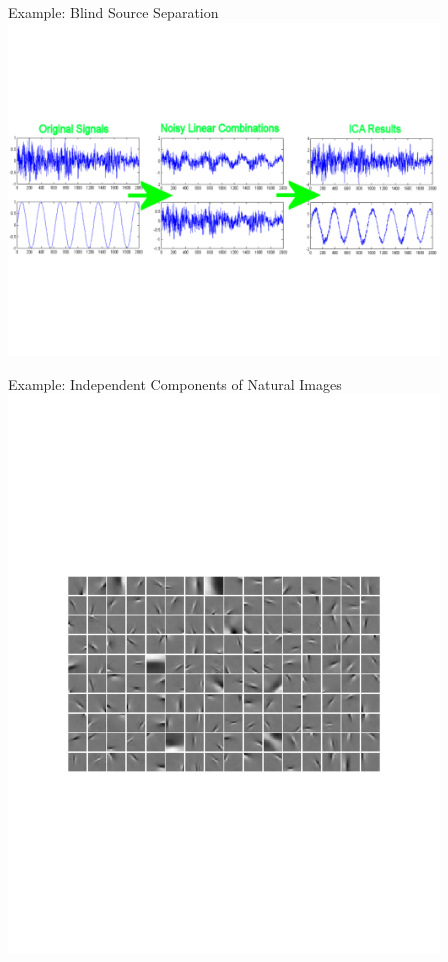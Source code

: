 \documentclass[serif,xcolor=pdftex,dvipsnames,table,hyperref={bookmarks=false,breaklinks}]{beamer}
\begin{document}
\begin{frame}[t]{Example: Blind Source Separation}
\center
\includegraphics[width=4.5in]{../Figures/ica_signals.pdf}
\end{frame}


\begin{frame}[t]{Example: Independent Components of Natural Images}
\center
\includegraphics[width=4.5in]{../Figures/ica_images.pdf}
\end{frame}
\end{document}
